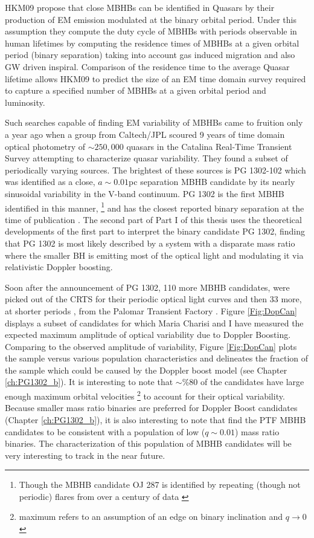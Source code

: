 HKM09 propose that close MBHBs can be identified in Quasars by their
production of EM emission modulated at the binary orbital period. Under this
assumption they compute the duty cycle of MBHBs with periods observable in
human lifetimes by computing the residence times of MBHBs at a given orbital
period (binary separation) taking into account gas induced migration and also
GW driven inspiral. Comparison of the residence time to the average Quasar
lifetime allows HKM09 to predict the size of an EM time domain survey required
to capture a specified number of MBHBs at a given orbital period and
luminosity.


Such searches capable of finding EM variability of MBHBs came to fruition only a
year ago when a group from Caltech/JPL scoured 9 years of time domain optical
photometry of $\sim250,000$ quasars in the Catalina Real-Time Transient
Survey \citep[CRTS][]{CRTS1:Drake:2009, CRTS2:Djorgovski:2010,
CRTS3:2011Mahabal, CRTS4:Djorgovski:2011} attempting to characterize quasar
variability. They found a subset of periodically varying sources. The
brightest of these sources is PG 1302-102 which was identified as a close, $a
\sim 0.01$pc separation MBHB candidate by its nearly sinusoidal variability in the
V-band continuum. PG 1302 is the first MBHB identified in this manner,
\footnote{Though the MBHB candidate OJ 287 is identified by repeating (though
not periodic) flares from over a century of data \citep{LehtoValtonen:1996,
Pursimo:2000}} and has the closest reported binary separation at the time of
publication \citep{Graham+2015a}. The second part of Part I of this thesis
uses the theoretical developments of the first part to interpret the binary
candidate PG 1302, finding that PG 1302 is most likely described by a system
with a disparate mass ratio where the smaller BH is emitting most of the
optical light and modulating it via relativistic Doppler boosting.


Soon after the announcement of PG 1302, 110 more MBHB candidates, were picked
out of the CRTS for their periodic optical light curves \citep{Graham+2015b}
and then 33 more, at shorter periods \citep{Charisi+2016}, from the Palomar
Transient Factory \citep[PTF][]{Rau:2009, Law:2009}. Figure \ref{Fig:DopCan}
displays a subset of candidates for which Maria Charisi and I have measured
the expected maximum amplitude of optical variability due to Doppler Boosting.
Comparing to the observed amplitude of variability, Figure \ref{Fig:DopCan}
plots the sample versus various population characteristics and delineates the
fraction of the sample which could be caused by the Doppler boost model (see
Chapter \ref{ch:PG1302_b}). It is interesting to note that $\sim \% 80$ of
the candidates have large enough maximum orbital velocities \footnote{maximum
refers to an assumption of an edge on binary inclination and $q \rightarrow
0$} to account for their optical variability. Because smaller mass ratio
binaries are preferred for Doppler Boost candidates (Chapter
\ref{ch:PG1302_b}), it is also interesting to note that \citep{Charisi+2016}
find the PTF MBHB candidates to be consistent with a population of low
($q\sim0.01$) mass ratio binaries. The characterization of this population of
MBHB candidates will be very interesting to track in the near future.


